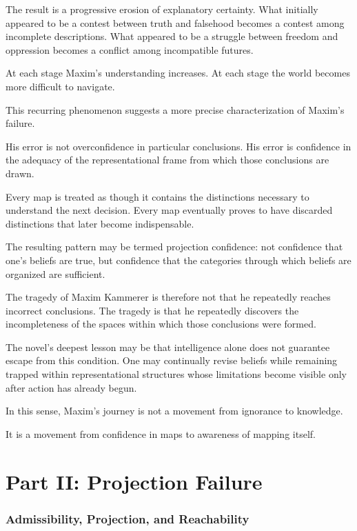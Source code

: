 \documentclass[12pt, a4paper]{article}
\theoremstyle{plain}
\theoremstyle{definition}
\theoremstyle{remark}
\begin{document}
The result is a progressive erosion of explanatory
certainty. What initially appeared to be a contest
between truth and falsehood becomes a contest among
incomplete descriptions. What appeared to be a
struggle between freedom and oppression becomes
a conflict among incompatible futures.

At each stage Maxim's understanding increases.
At each stage the world becomes more difficult
to navigate.

This recurring phenomenon suggests a more precise
characterization of Maxim's failure.

His error is not overconfidence in particular
conclusions. His error is confidence in the
adequacy of the representational frame from which
those conclusions are drawn.

Every map is treated as though it contains the
distinctions necessary to understand the next
decision. Every map eventually proves to have
discarded distinctions that later become
indispensable.

The resulting pattern may be termed projection
confidence: not confidence that one's beliefs
are true, but confidence that the categories
through which beliefs are organized are sufficient.

The tragedy of Maxim Kammerer is therefore not
that he repeatedly reaches incorrect conclusions.
The tragedy is that he repeatedly discovers the
incompleteness of the spaces within which those
conclusions were formed.

The novel's deepest lesson may be that intelligence
alone does not guarantee escape from this condition.
One may continually revise beliefs while remaining
trapped within representational structures whose
limitations become visible only after action has
already begun.

In this sense, Maxim's journey is not a movement
from ignorance to knowledge.

It is a movement from confidence in maps to
awareness of mapping itself.

\newpage
\part*{Part II: Projection Failure}

\section{Admissibility, Projection, and Reachability}
\end{document}
